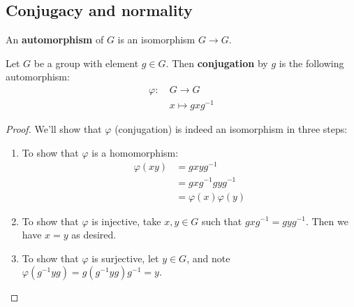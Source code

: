 \documentclass{article}
\theoremstyle{plain}
\begin{document}
\subsection{Conjugacy and normality}
\begin{definition}{}{}
An \textbf{automorphism} of $G$ is an isomorphism $G \to G$.
\end{definition}
\begin{definition}{}{}
Let $G$ be a group with element $g \in G$. Then \textbf{conjugation} by $g$ is the following automorphism:
\begin{align*}
\varphi : \ &G \to G \\
&x\mapsto gx{g^{-1}}
\end{align*}
\end{definition}
\begin{proof}
We'll show that $\varphi$  (conjugation) is indeed an isomorphism in three steps:
\begin{enumerate}[ i. ]
\item To show that $\varphi$ is a homomorphism:
\begin{align*}
\varphi(xy) &= gxyg^{-1} \\
&= gxg^{-1}gyg^{-1} \\
&= \varphi(x)\varphi(y)
\end{align*}
\item To show that $\varphi$ is injective, take $x,y \in G$ such that $gxg^{-1} = gyg^{-1}$. Then we have $x=y$ as desired.
\item To show that $\varphi$ is surjective, let $y\in G$, and note $\varphi(g^{-1}yg) = g(g^{-1}yg)g^{-1} = y$.
\end{enumerate}
\end{proof}
\end{document}
